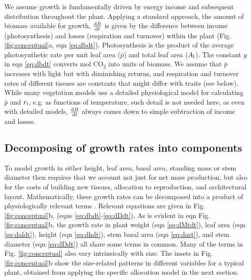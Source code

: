 \documentclass[a4paper,11pt]{article}
\begin{document}
We assume growth is fundamentally driven by energy income and subsequent distribution throughout the plant. Applying a standard approach, the amount of biomass available for growth, $\frac{{\rm d}B}{{\rm d}t}$ is given by the difference between income (photosynthesis) and losses (respiration and turnover) within the plant \citep{Makela-1997, Thornley-2000} (Fig. \ref{fig:conceptual}a, eqn \ref{eq:dbdt}). Photosynthesis is the product of the average photosynthetic rate per unit leaf area ($\bar{p}$) and total leaf area ($A_{\rm l}$). The constant $y$ in eqn \ref{eq:dbdt} converts mol CO$_2$ into units of biomass. We assume that $\bar{p}$ increases with light but with diminishing returns, and respiration and turnover rates of different tissues are constants that might differ with traits (see below). While many vegetation models use a detailed physiological model for calculating $\bar{p}$ and $r_{\rm i}$, e.g. as functions of temperature, such detail is not needed here, as even with detailed models, $\frac{{\rm d}B}{{\rm d}t}$ always comes down to simple subtraction of income and losses.

\subsection{Decomposing of growth rates into components}

To model growth in either height, leaf area, basal area, standing mass or stem diameter then requires that we account not just for net mass production, but also for the costs of building new tissues, allocation to reproduction, and architectural layout. Mathematically, these growth rates can be decomposed into a product of physiologically relevant terms \citep{Falster-2011, Gibert-2016}. Relevant equations are given in Fig. \ref{fig:conceptual}b, (eqns \ref{eq:dbdt}-\ref{eq:dDdt}). As is evident in eqn  Fig. \ref{fig:conceptual}b, the growth rate in plant weight (eqn \ref{eq:dMtdt}), leaf area (eqn \ref{eq:daldt}), height (eqn \ref{eq:dhdt}), stem basal area (eqn \ref{eq:dast}), and stem diameter (eqn \ref{eq:dDdt}) all share some terms in common. Many of the terms in Fig. \ref{fig:conceptual} also vary intrinsically with size. The insets in Fig. \ref{fig:conceptual}b show the size-related patterns in different variables for a typical plant, obtained from applying the specific allocation model in the next section.
\end{document}
